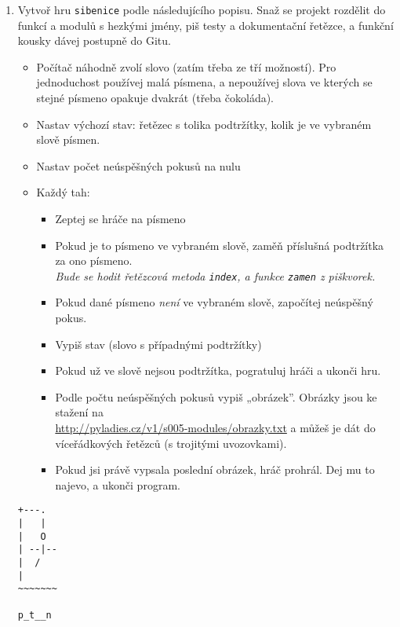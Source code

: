 \documentclass[a4paper,10pt]{article}
\begin{document}
\begin{enumerate}[resume]

\item Vytvoř hru \texttt{sibenice} podle následujícího popisu.
    Snaž se projekt rozdělit do funkcí a modulů s hezkými jmény,
    piš testy a dokumentační řetězce, a funkční kousky dávej postupně do Gitu.

    \begin{itemize}
        \item Počítač náhodně zvolí slovo (zatím třeba ze tří možností).
            Pro jednoduchost používej malá písmena, a nepoužívej slova
            ve kterých se stejné písmeno opakuje dvakrát
            (třeba č\textcolor{plpink}{o}k\textcolor{plpink}{o}láda).
        \item Nastav výchozí stav: řetězec s tolika podtržítky, kolik je
             ve vybraném slově písmen.
        \item Nastav počet neúspěšných pokusů na nulu
        \item Každý tah:
            \begin{itemize}
                \item Zeptej se hráče na písmeno
                \item Pokud je to písmeno ve vybraném slově, zaměň příslušná
                    podtržítka za ono písmeno.
                    \\\emph{\small Bude se hodit řetězcová metoda \texttt{index},
                    a funkce \texttt{zamen} z piškvorek.}
                \item Pokud dané písmeno \emph{není} ve vybraném slově,
                    započítej neúspěšný pokus.
                \item Vypiš stav (slovo s případnými podtržítky)
                \item Pokud už ve slově nejsou podtržítka, pogratuluj hráči
                    a ukonči hru.
                \item Podle počtu neúspěšných pokusů vypiš „obrázek”.
                    Obrázky jsou ke stažení na \\\url{http://pyladies.cz/v1/s005-modules/obrazky.txt}
                    a můžeš je dát do víceřádkových řetězců (s trojitými uvozovkami).
                \item Pokud jsi právě vypsala poslední obrázek, hráč prohrál.
                    Dej mu to najevo, a ukonči program.
            \end{itemize}
    \end{itemize}

\begin{verbatim}
+---.
|   |
|   O
| --|--
|  /
|
~~~~~~~

p_t__n

\end{verbatim}

\end{enumerate}
\end{document}
